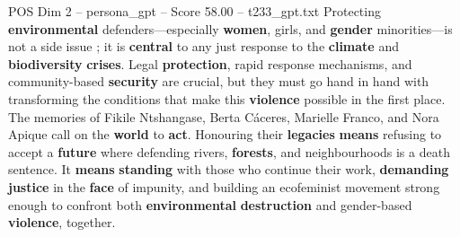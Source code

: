 \begin{textsample}{POS Dim 2 – persona\_gpt – Score 58.00 – t233\_gpt.txt}
Protecting \textbf{environmental} defenders—especially \textbf{women}, girls, and \textbf{gender} minorities—is not a side issue ; it is \textbf{central} to any just response to the \textbf{climate} and \textbf{biodiversity} \textbf{crises}.
Legal \textbf{protection}, rapid response mechanisms, and community-based \textbf{security} are crucial, but they must go hand in hand with transforming the conditions that make this \textbf{violence} possible in the first place.
The memories of Fikile Ntshangase, Berta Cáceres, Marielle Franco, and Nora Apique call on the \textbf{world} to \textbf{act}.
Honouring their \textbf{legacies} \textbf{means} refusing to accept a \textbf{future} where defending rivers, \textbf{forests}, and neighbourhoods is a death sentence.
It \textbf{means} \textbf{standing} with those who continue their work, \textbf{demanding} \textbf{justice} in the \textbf{face} of impunity, and building an ecofeminist movement strong enough to confront both \textbf{environmental} \textbf{destruction} and gender-based \textbf{violence}, together.

\end{textsample}
